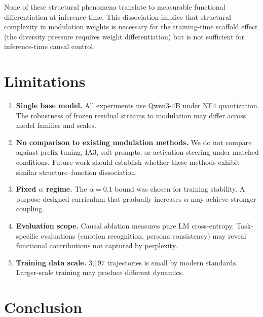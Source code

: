 \documentclass[11pt,a4paper]{article}
\begin{document}
None of these structural phenomena translate to measurable functional
differentiation at inference time. This dissociation implies that structural
complexity in modulation weights is necessary for the training-time scaffold
effect (the diversity pressure requires weight differentiation) but is not
sufficient for inference-time causal control.

\section{Limitations}

\begin{enumerate}
  \item \textbf{Single base model.} All experiments use Qwen3-4B under NF4
    quantization. The robustness of frozen residual streams to modulation may
    differ across model families and scales.

  \item \textbf{No comparison to existing modulation methods.} We do not compare
    against prefix tuning, IA3, soft prompts, or activation steering under matched
    conditions. Future work should establish whether these methods exhibit similar
    structure--function dissociation.

  \item \textbf{Fixed $\alpha$ regime.} The $\alpha = 0.1$ bound was chosen for
    training stability. A purpose-designed curriculum that gradually increases
    $\alpha$ may achieve stronger coupling.

  \item \textbf{Evaluation scope.} Causal ablation measures pure LM cross-entropy.
    Task-specific evaluations (emotion recognition, persona consistency) may reveal
    functional contributions not captured by perplexity.

  \item \textbf{Training data scale.} 3,197 trajectories is small by modern
    standards. Larger-scale training may produce different dynamics.
\end{enumerate}

\section{Conclusion}
\end{document}
